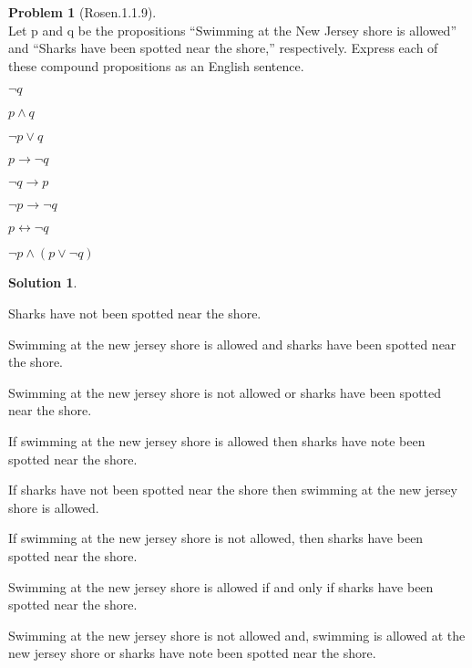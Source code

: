 \documentclass{article}
\theoremstyle{definition}
\newtheorem*{problem}{Problem}
\newtheorem*{solution}{Solution}
\begin{document}
\begin{problem}[Rosen.1.1.9]\ \\
Let p and q be the propositions “Swimming at the New
Jersey shore is allowed” and “Sharks have been spotted
near the shore,” respectively. Express each of these compound
propositions as an English sentence.
\begin{compactenum}
\renewcommand{\theenumi}{\alph{enumi}}
\item $\neg q$ 
\item $p \wedge q$ 
\item $\neg p \vee q$
\item $p \rightarrow \neg q$ 
\item $\neg q \rightarrow p$ 
\item $\neg p \rightarrow \neg q$
\item $p \leftrightarrow \neg q$ 
\item $\neg p \wedge (p \vee \neg q)$
\end{compactenum}
\end{problem}
\begin{solution}\ \\

\begin{compactenum}
\renewcommand{\theenumi}{\alph{enumi}}
\item Sharks have not been spotted near the shore.
\item Swimming at the new jersey shore is allowed and sharks have been spotted near the shore.
\item Swimming at the new jersey shore is not allowed or sharks have been spotted near the shore.
\item If swimming at the new jersey shore is allowed then sharks have note been spotted near the shore.
\item If sharks have not been spotted near the shore then swimming at the new jersey shore is allowed.
\item If swimming at the new jersey shore is not allowed, then sharks have been spotted near the shore.
\item Swimming at the new jersey shore is allowed if and only if sharks have been spotted near the shore.
\item Swimming at the new jersey shore is not allowed and, swimming is allowed at the new jersey shore or sharks have note been spotted near the shore.
\end{compactenum}
\end{solution}
\end{document}
